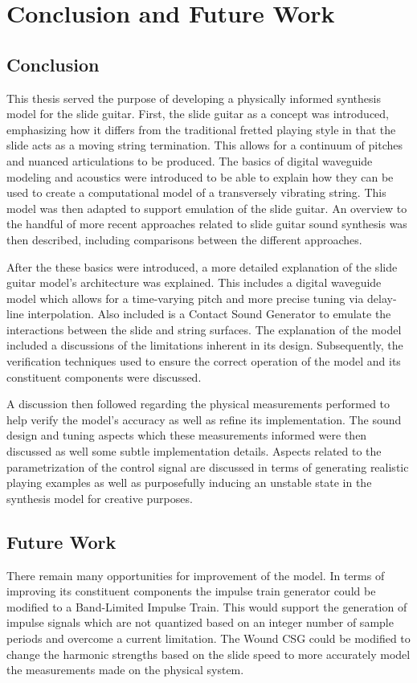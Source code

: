 \documentclass[../main.tex]{subfiles}
\begin{document}
\chapter{Conclusion and Future Work}

\section{Conclusion}
This thesis served the purpose of developing a physically informed synthesis model for the slide guitar. First, the slide guitar as a concept was introduced, emphasizing how it differs from the traditional fretted playing style in that the slide acts as a moving string termination. This allows for a continuum of pitches and nuanced articulations to be produced. The basics of digital waveguide modeling and acoustics were introduced to be able to explain how they can be used to create a computational model of a transversely vibrating string. This model was then adapted to support emulation of the slide guitar. An overview to the handful of more recent approaches related to slide guitar sound synthesis was then described, including comparisons between the different approaches.

After the these basics were introduced, a more detailed explanation of the slide guitar model's architecture was explained. This includes a digital waveguide model which allows for a time-varying pitch and more precise tuning via delay-line interpolation. Also included is a Contact Sound Generator to emulate the interactions between the slide and string surfaces. The explanation of the model included a discussions of the limitations inherent in its design. Subsequently, the verification techniques used to ensure the correct operation of the model and its constituent components were discussed.

A discussion then followed regarding the physical measurements performed to help verify the model's accuracy as well as refine its implementation. The sound design and tuning aspects which these measurements informed were then discussed as well some subtle implementation details. Aspects related to the parametrization of the control signal are discussed in terms of generating realistic playing examples as well as purposefully inducing an unstable state in the synthesis model for creative purposes.

\section{Future Work}
There remain many opportunities for improvement of the model. In terms of improving its constituent components the impulse train generator could be modified to a Band-Limited Impulse Train. This would support the generation of impulse signals which are not quantized based on an integer number of sample periods and overcome a current limitation. The Wound CSG could be modified to change the harmonic strengths based on the slide speed to more accurately model the measurements made on the physical system.
\end{document}
